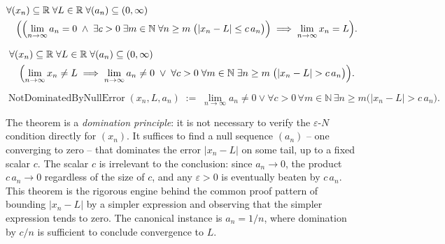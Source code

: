 \begin{remark*}
\[
\begin{aligned}
&\forall (x_n) \subseteq \mathbb{R} \;\forall L \in \mathbb{R}
 \;\forall (a_n) \subseteq (0, \infty)\\
&\quad\Bigl(
    \Bigl(
        \lim_{n \to \infty} a_n = 0
        \;\land\;
        \exists c > 0 \;\exists m \in \mathbb{N}
        \;\forall n \ge m \;\bigl(|x_n - L| \le c\, a_n\bigr)
    \Bigr)
    \;\Longrightarrow\;
    \lim_{n \to \infty} x_n = L
\Bigr).
\end{aligned}
\]
\end{remark*}

\begin{remark*}
\[
\begin{aligned}
&\forall (x_n) \subseteq \mathbb{R} \;\forall L \in \mathbb{R}
 \;\forall (a_n) \subseteq (0,\infty)\\
&\quad\Bigl(
    \lim_{n \to \infty} x_n \neq L
    \;\Longrightarrow\;
    \lim_{n \to \infty} a_n \neq 0
    \;\lor\;
    \forall c > 0 \;\forall m \in \mathbb{N}
    \;\exists n \ge m \;\bigl(|x_n - L| > c\, a_n\bigr)
\Bigr).
\end{aligned}
\]
\end{remark*}

\begin{remark*}
\[
\operatorname{NotDominatedByNullError}(x_n,L,a_n)
\;:=\;
\lim_{n\to\infty}a_n\neq 0
\lor
\forall c>0\,\forall m\in\mathbb{N}\,\exists n\ge m
\bigl(|x_n-L|>c\,a_n\bigr).
\]
\end{remark*}

\begin{remark*}[Interpretation]
The theorem is a \emph{domination principle}: it is not necessary to
verify the $\varepsilon$-$N$ condition directly for $(x_n)$. It
suffices to find a null sequence $(a_n)$ -- one converging to zero --
that dominates the error $|x_n - L|$ on some tail, up to a fixed
scalar $c$. The scalar $c$ is irrelevant to the conclusion: since
$a_n \to 0$, the product $c\, a_n \to 0$ regardless of the size of
$c$, and any $\varepsilon > 0$ is eventually beaten by $c\, a_n$.
This theorem is the rigorous engine behind the common proof pattern
of bounding $|x_n - L|$ by a simpler expression and observing that
the simpler expression tends to zero. The canonical instance is
$a_n = 1/n$, where domination by $c/n$ is sufficient to conclude
convergence to $L$.
\end{remark*}

